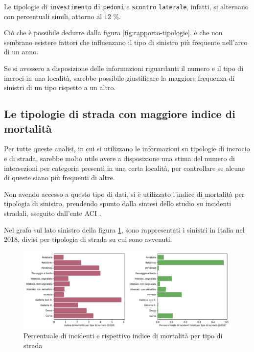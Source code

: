 \documentclass[a4paper,12pt]{report}
\newcommand{\columnstyle}[1]{\texttt{#1}}
\begin{document}
Le tipologie di \columnstyle{investimento} \columnstyle{di} \columnstyle{pedoni} e 
\columnstyle{scontro} \columnstyle{laterale}, 
infatti, si alternano con percentuali simili, attorno al $12$ \%. 

Ciò che è possibile dedurre dalla figura \ref{fig:rapporto-tipologie}, è che non 
sembrano esistere fattori che influenzano il tipo di sinistro più frequente 
nell'arco di un anno.

Se si avessero a disposizione delle informazioni riguardanti il numero e il tipo 
di incroci in una località, sarebbe possibile giustificare 
la maggiore frequenza di sinistri di un tipo rispetto a un altro. 

\subsection{Le tipologie di strada con maggiore indice di mortalità}

Per tutte queste analisi, in cui si utilizzano le informazioni su tipologie 
di incrocio e di strada, 
sarebbe molto utile avere a disposizione una stima del numero di intersezioni 
per categoria presenti in una certa località, 
per controllare se alcune di queste siano più frequenti di altre. 

Non avendo accesso a questo tipo di dati, si è utilizzato l'indice di 
mortalità per tipologia di sinistro, prendendo spunto dalla sintesi dello 
studio su incidenti stradali, eseguito dall'ente ACI \cite{ACI:2}. 

Nel grafo sul lato sinistro della figura \ref{fig:tipo-intersezioni}, 
sono rappresentati i sinistri in Italia nel 2018, divisi per tipologia 
di strada su cui sono avvenuti. 

\begin{figure}
    \includegraphics[width=\linewidth]{img_unite/intersezioni_indice_mortalita.png}
    \caption{Percentuale di incidenti e rispettivo indice di mortalità per tipo di strada}
    \label{fig:tipo-intersezioni}
\end{figure}
\end{document}
